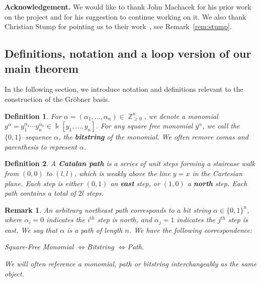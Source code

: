 \documentclass[10pt,a4paper]{article}
\newtheorem{definition}{Definition}[section]
\newtheorem{remark}{Remark}[section]
\def\field{\Bbbk}
\DeclareMathOperator{\Z}{\mathbb{Z}}
\begin{document}
\medskip
\noindent
\textbf{Acknowledgement.} We would like to thank John Machacek for his prior work on the project and for his suggestion to continue working on it. 
We also thank Christian Stump for pointing us to their work~\cite{ESS}, see Remark~\ref{rem:stump}.


\subsection{ \label{background} Definitions, notation and a loop version of our main theorem}

In the following section, we introduce notation and definitions relevant to the construction of the Gr\"obner basis.
\begin{definition}
	For $\alpha = (\alpha_1, \dots, \alpha_n) \in \Z_{\geq 0}^n$, we denote a monomial $y^\alpha = y_1^{\alpha_1} \cdots y_n^{\alpha_n}\in \field[y_1, \dots, y_n]$. 
	For any square free monomial $y^\alpha$, we call the $\{0,1\}$--sequence $\alpha$, the {\bf bitstring} of the monomial. We often remove comas and parenthesis to represent $\alpha$.
\end{definition}
\begin{definition} \label{catalan_path}
	A {\bf Catalan path} is a series of unit steps forming a staircase walk from $(0,0)$ to $(l,l)$, which is weakly above the line $y=x$ in the Cartesian plane. Each step is either $(0,1)$  an  {\bf east} step, or $(1,0)$ a {\bf north} step. Each path contains a total of $2l$ steps.
\end{definition}
\begin{remark}\label{rem:path}
	   An arbitrary northeast path corresponds to a bit string $\alpha \in \{0, 1 \}^n$, where $\alpha_i = 0$ indicates  the $i^{th}$ step is north, and $\alpha_j = 1$ indicates the $j^{th}$ step 
	   is east. We say that $\alpha$ is a path of length $n$. We have the following correspondence:
	   \begin{center}
		Square-Free Monomial \quad$\iff$\quad Bitstring \quad$\iff$\quad Path.
	   \end{center}
	   We will often reference a monomial, path or bitstring interchangeably as the same object.
\end{remark}
\end{document}
